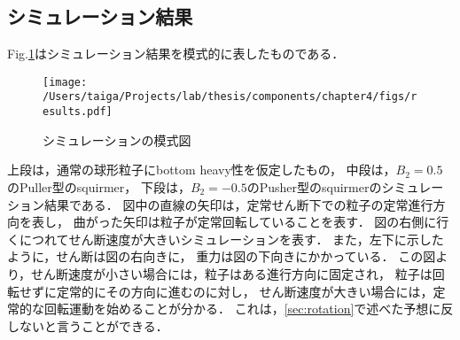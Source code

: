 \subsection{シミュレーション結果}
\label{simulation_results}
Fig.\ref{fig:results}はシミュレーション結果を模式的に表したものである．

    \begin{figure}[htbp]
        \centering
        \texttt{[image: /Users/taiga/Projects/lab/thesis/components/chapter4/figs/results.pdf]}
        \caption{シミュレーションの模式図}
        \label{fig:results}
    \end{figure}

\noindent
上段は，通常の球形粒子にbottom heavy性を仮定したもの，
中段は，$B_2 = 0.5$のPuller型のsquirmer，
下段は，$B_2 = -0.5$のPusher型のsquirmerのシミュレーション結果である．
図中の直線の矢印は，定常せん断下での粒子の定常進行方向を表し，
曲がった矢印は粒子が定常回転していることを表す．
図の右側に行くにつれてせん断速度が大きいシミュレーションを表す．
また，左下に示したように，せん断は図の右向きに，
重力は図の下向きにかかっている．
この図より，せん断速度が小さい場合には，粒子はある進行方向に固定され，
粒子は回転せずに定常的にその方向に進むのに対し，
せん断速度が大きい場合には，定常的な回転運動を始めることが分かる．
これは，\ref{sec:rotation}で述べた予想に反しないと言うことができる．
